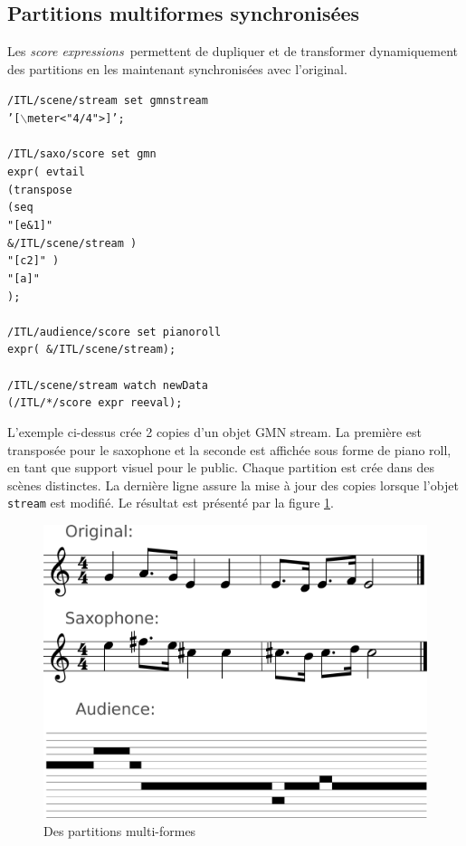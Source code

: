 \documentclass{article}
\newcommand{\OSC}[1]{\texttt{#1}}
\newcommand{\sExprs}{\emph{score expressions}}
\newcommand{\tab}{\hspace*{4mm}}
\newcommand{\sample}	[1]			{\vspace{-0.2em}\begin{center}\colorbox{mygrey}{\begin{minipage}[t]{0.97\columnwidth} {\small \texttt{#1}}\end{minipage}}\end{center}}
\begin{document}
\subsection{Partitions multiformes synchronisées}
\label{sample2}

Les \sExprs\ permettent de dupliquer et de transformer dynamiquement des partitions en les maintenant synchronisées avec l'original.

\sample{/ITL/scene/stream set gmnstream \\
\tab '[$\backslash$meter<"4/4">]';\\
\\
/ITL/saxo/score set gmn \\
\tab expr( evtail\\
\tab \tab (transpose\\
\tab \tab \tab (seq\\
\tab \tab \tab \tab "[e\&1]"\\
\tab \tab \tab \tab \&/ITL/scene/stream )\\
\tab \tab \tab "[c2]" )\\
\tab \tab "[a]"\\
\tab );\\
\\
/ITL/audience/score set pianoroll \\
\tab expr( \&/ITL/scene/stream);\\
\\
/ITL/scene/stream watch newData\\
\tab(/ITL/*/score expr reeval);
}
L'exemple ci-dessus crée 2 copies d'un objet GMN stream. La première est transposée pour le saxophone et la seconde est affichée sous forme de piano roll, en tant que support visuel pour le public. Chaque partition est crée dans des scènes distinctes. La dernière ligne assure la mise à jour des copies lorsque l'objet \OSC{stream} est modifié. Le résultat est présenté par la figure \ref{fig:mutliscoreFig}.

\begin{figure}[th]
\centering
\includegraphics[width=0.9\columnwidth]{imgs/example1}
\caption{Des partitions multi-formes
\label{fig:mutliscoreFig}}
\end{figure}
\end{document}
